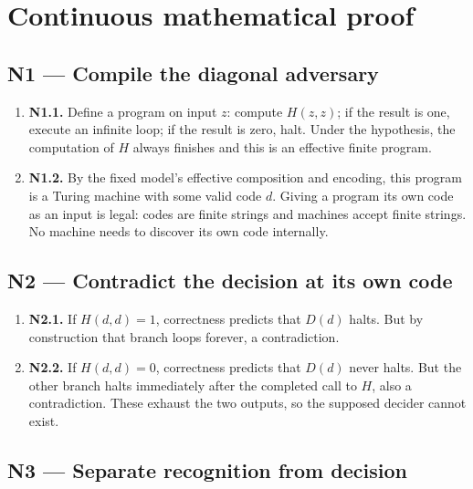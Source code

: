 \documentclass[preprint,12pt,aps,pra,showkeys,amsmath,amssymb,superscriptaddress,floatfix]{revtex4-2}
\theoremstyle{definition}
\theoremstyle{remark}
\begin{document}
\endgroup\clearpage\section{Continuous mathematical proof}\label{sec:proof}

\subsection{N1 --- Compile the diagonal
adversary}\label{n1-compile-the-diagonal-adversary}

\begin{enumerate}
\def\labelenumi{\arabic{enumi}.}
\item
  \textbf{N1.1.} Define a program on input \(z\): compute \(H(z,z)\); if
  the result is one, execute an infinite loop; if the result is zero,
  halt. Under the hypothesis, the computation of \(H\) always finishes
  and this is an effective finite program.
\item
  \textbf{N1.2.} By the fixed model's effective composition and
  encoding, this program is a Turing machine with some valid code \(d\).
  Giving a program its own code as an input is legal: codes are finite
  strings and machines accept finite strings. No machine needs to
  discover its own code internally.
\end{enumerate}

\subsection{N2 --- Contradict the decision at its own
code}\label{n2-contradict-the-decision-at-its-own-code}

\begin{enumerate}
\def\labelenumi{\arabic{enumi}.}
\item
  \textbf{N2.1.} If \(H(d,d)=1\), correctness predicts that \(D(d)\)
  halts. But by construction that branch loops forever, a contradiction.
\item
  \textbf{N2.2.} If \(H(d,d)=0\), correctness predicts that \(D(d)\)
  never halts. But the other branch halts immediately after the
  completed call to \(H\), also a contradiction. These exhaust the two
  outputs, so the supposed decider cannot exist.
\end{enumerate}

\subsection{N3 --- Separate recognition from
decision}\label{n3-separate-recognition-from-decision}
\end{document}
